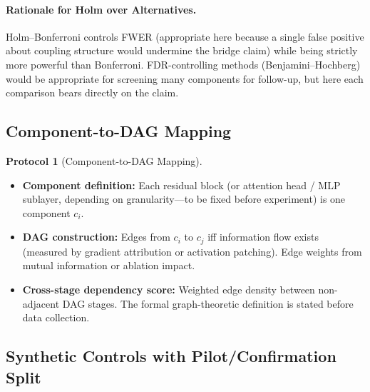 \documentclass[11pt,a4paper]{article}
\theoremstyle{definition}
\newtheorem{protocol}[theorem]{Protocol}
\theoremstyle{remark}
\begin{document}
\paragraph{Rationale for Holm over Alternatives.}
Holm--Bonferroni controls FWER (appropriate here because a single false
positive about coupling structure would undermine the bridge claim) while being
strictly more powerful than Bonferroni.  FDR-controlling methods
(Benjamini--Hochberg) would be appropriate for screening many components for
follow-up, but here each comparison bears directly on the claim.

\subsection{Component-to-DAG Mapping}\label{subsec:dag-mapping}

\begin{protocol}[Component-to-DAG Mapping]\label{prot:dag}
  \leavevmode
  \begin{itemize}
    \item \textbf{Component definition:} Each residual block (or attention
      head / MLP sublayer, depending on granularity---to be fixed before
      experiment) is one component $c_i$.
    \item \textbf{DAG construction:} Edges from $c_i$ to $c_j$ iff
      information flow exists (measured by gradient attribution or activation
      patching).  Edge weights from mutual information or ablation impact.
    \item \textbf{Cross-stage dependency score:} Weighted edge density between
      non-adjacent DAG stages.  The formal graph-theoretic definition is stated
      before data collection.
  \end{itemize}
\end{protocol}

\subsection{Synthetic Controls with Pilot/Confirmation Split}%
\label{subsec:controls}
\end{document}
